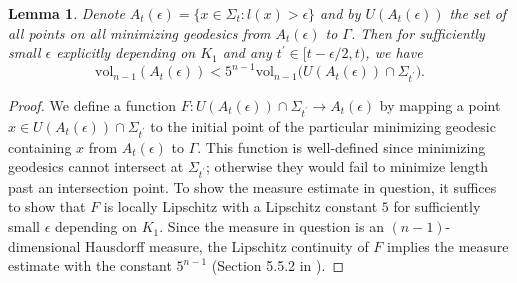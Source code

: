 \documentclass[11pt,letterpaper]{amsart}
\numberwithin{equation}{section}
\theoremstyle{definition}
\theoremstyle{plain}
\theoremstyle{definition}
\theoremstyle{plain}
\theoremstyle{definition}
\theoremstyle{plain}
\newtheorem{areaLipschitz}[riccati]{Lemma}
\newcommand{\vol}{\textrm{vol}}
\begin{document}
\begin{areaLipschitz}\label{areaLipschitz}
Denote $A_t(\epsilon)=\{x\in \Sigma_t: l(x)>\epsilon\}$ and by $U(A_t(\epsilon))$ the set of all points on all minimizing geodesics from $A_t(\epsilon)$ to $\Gamma$. Then for sufficiently small $\epsilon$ explicitly depending on $K_1$ and any $t^{\prime}\in [t-\epsilon/2,t)$, we have 
$$\vol_{n-1}(A_t(\epsilon))<5^{n-1} \vol_{n-1}\big(U(A_t(\epsilon))\cap \Sigma_{t^{\prime}}\big).$$
\end{areaLipschitz}
\begin{proof}
We define a function $F: U(A_t(\epsilon))\cap \Sigma_{t^{\prime}}\to A_t(\epsilon)$ by mapping a point $x\in U(A_t(\epsilon))\cap \Sigma_{t^{\prime}}$ to the initial point of the particular minimizing geodesic containing $x$ from $A_t(\epsilon)$ to $\Gamma$. This function is well-defined since minimizing geodesics cannot intersect at $\Sigma_{t^{\prime}}$; otherwise they would fail to minimize length past an intersection point. To show the measure estimate in question, it suffices to show that $F$ is locally Lipschitz with a Lipschitz constant $5$ for sufficiently small $\epsilon$ depending on $K_1$. Since the measure in question is an $(n-1)$-dimensional Hausdorff measure, the Lipschitz continuity of $F$ implies the measure estimate with the constant $5^{n-1}$ (Section 5.5.2 in \cite{BBI}).


\end{proof}
\end{document}
